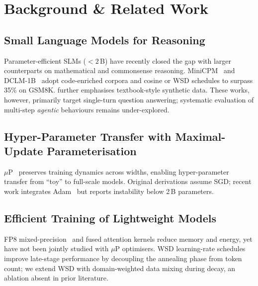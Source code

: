 \section{Background \& Related Work}

\subsection{Small Language Models for Reasoning}
Parameter-efficient SLMs ($<2$\,B) have recently closed the gap with larger counterparts on mathematical and commonsense reasoning.
MiniCPM~\citep{minicpm4} and DCLM-1B~\citep{dclm2024} adopt code-enriched corpora and cosine or WSD schedules to surpass 35\% on GSM8K.
\citet{phi35} further emphasises textbook-style synthetic data.
These works, however, primarily target single-turn question answering; systematic evaluation of multi-step \emph{agentic} behaviours remains under-explored.

\subsection{Hyper-Parameter Transfer with Maximal-Update Parameterisation}
$\mu$P~\citep{yang2022tensor,yang2023tensor} preserves training dynamics across widths, enabling hyper-parameter transfer from ``toy'' to full-scale models.
Original derivations assume SGD; recent work integrates Adam~\citep{adam2017} but reports instability below 2\,B parameters.

\subsection{Efficient Training of Lightweight Models}
FP8 mixed-precision~\citep{fp8nvidia2022} and fused attention kernels reduce memory and energy, yet have not been jointly studied with $\mu$P optimisers.
WSD learning-rate schedules~\citep{minicpm2024} improve late-stage performance by decoupling the annealing phase from token count; we extend WSD with domain-weighted data mixing during decay, an ablation absent in prior literature.